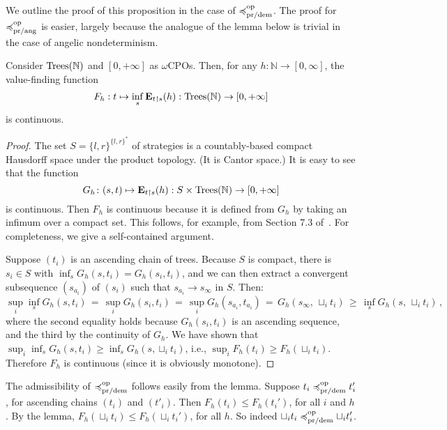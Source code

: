 We outline the proof of this proposition in the case of $\preccurlyeq^{\text{op}}_{\text{pr/dem}}$. The proof for  $\preccurlyeq^{\text{op}}_{\text{pr/ang}}$ is easier, largely because the analogue of the lemma below is trivial in the case of angelic nondeterminism.
\begin{lemma} 
\label{lemma:F-continuous}
Consider $\textnormal{Trees}(\mathbb{N})$ and $[0,+\infty]$ as $\omega$CPOs. Then,
for any $h \colon \mathbb{N} \to [0,\infty]$, 
the value-finding function \[F_h : t \mapsto \inf_s  \mathbf{E}_{t\restriction s} (h) : \textnormal{Trees}(\mathbb{N}) \to [0,+\infty]\]
is continuous.
\end{lemma}
\begin{proof}
The set $S = \{l,r\}^{\{l,r\}^*}$ of strategies is a countably-based compact Hausdorff space under the product topology. (It is Cantor space.)
It is easy to see that  the function 
\[G_h \colon (s,t) \mapsto \mathbf{E}_{t\restriction s} (h) : S \times \textnormal{Trees}(\mathbb{N})  \to [0,+\infty] \]
is continuous.
Then $F_h$ is continuous because it is defined from $G_h$ by taking an infimum over a compact set. 
This follows, for example, from Section 7.3 of~\cite{AndreaShalk}. For completeness, we give a self-contained argument. 

Suppose $(t_i)$ is an ascending chain of trees.
Because $S$ is compact,  there is $s_i \in S$ with $\inf_s G_h(s,t_i) = G_h(s_i, t_i)$,
and we can then extract a convergent 
subsequence  $(s_{a_i})$ of $(s_i)$ such that $s_{a_i} \rightarrow s_\infty$ in $S$. Then:
\begin{equation*}
                \sup_i \inf_s G_h(s,t_i)
                \, =\, 
                \sup_i G_h(s_i, t_i)
                \, = \,
                \sup_i G_h(s_{a_i}, t_{a_i})
                \, = \,
                G_h(s_\infty, \, \sqcup_i t_i)
                \, \geq \,
                \inf_s  G_h(s, \, \sqcup_i t_i)\, ,
            \end{equation*}
where the second equality holds because $G_h(s_i, t_i)$ is an ascending sequence, and the third by the continuity of  $G_h$.
We have shown that $ \sup_i  \inf_s G_h(s,t_i) \geq \inf_s  G_h(s, \sqcup_i t_i)$, i.e., 
$ \sup_i  F_h(t_i) \geq F_h(\sqcup_i t_i)$. 
Therefore $F_h$ is continuous (since it is obviously monotone).
\end{proof}

\noindent
The admissibility of $\preccurlyeq^{\text{op}}_{\text{pr/dem}}$ follows easily from the lemma.
Suppose $t_i \preccurlyeq^{\text{op}}_{\text{pr/dem}} t_i'$, for ascending chains $(t_i)$ and $(t'_i)$.
Then $F_h(t_i) \leq F_h (t_i')$, for all $i$ and $h$. By the lemma, 
 $F_h (\sqcup_i t_i) \leq F_h (\sqcup_i t_i')$, for all $h$.
So indeed  $\sqcup_i t_i \preccurlyeq^{\text{op}}_{\text{pr/dem}} \sqcup_i t_i'$.

